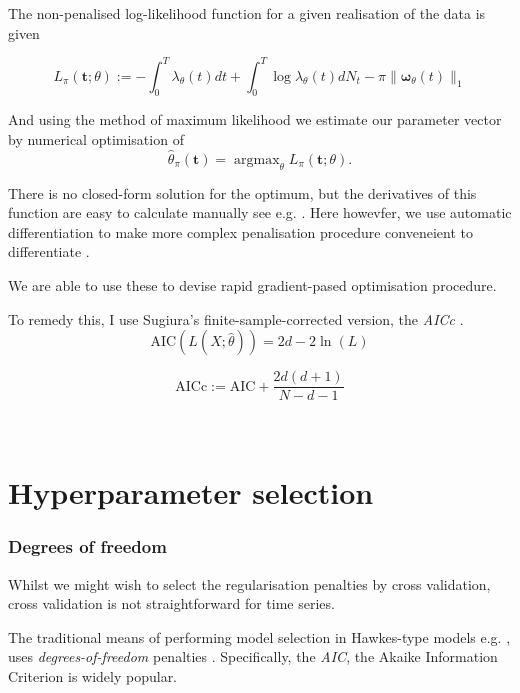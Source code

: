 \documentclass[11pt]{article}
\begin{document}
The non-penalised log-likelihood function for a given realisation of the
data is given

\[L_\pi(\mathbf t;\theta):=-\int_0^T\lambda_\theta(t)dt + \int_0^T\log \lambda_\theta(t) dN_t - \pi\|\boldsymbol \omega_\theta(t)\|_1\]

And using the method of maximum likelihood we estimate our parameter
vector by numerical optimisation of
\[\hat{\theta}_\pi(\mathbf t) = \operatorname{argmax}_\theta L_\pi(\mathbf t;\theta).\]

There is no closed-form solution for the optimum, but the derivatives of
this function are easy to calculate manually see e.g.
\cite{ozaki_maximum_1979}. Here howevfer, we use automatic
differentiation to make more complex penalisation procedure conveneient
to differentiate \cite{baydin_automatic_2014}.

We are able to use these to devise rapid gradient-pased optimisation
procedure.

    To remedy this, I use Sugiura's finite-sample-corrected version, the
\emph{AICc} \cite{sugiura_further_1978}.
\[{\mathrm {AIC}(L(X;\hat{\theta}))}=2d-2\ln(L)\]

\[{\mathrm {AICc}}:={\mathrm {AIC}}+{\frac {2d(d+1)}{N-d-1}}\]



    \begin{center}
    \end{center}
    { \hspace*{\fill} \\}
    
    \section{Hyperparameter selection}\label{hyperparameter-selection}

    \subsubsection{Degrees of freedom}\label{degrees-of-freedom}

Whilst we might wish to select the regularisation penalties by cross
validation, cross validation is not straightforward for time series.

The traditional means of performing model selection in Hawkes-type
models e.g. \cite{ogata_estimation_1983}, uses \emph{degrees-of-freedom}
penalties \cite{efron_how_1886}. Specifically, the \emph{AIC}, the
Akaike Information Criterion \cite{akaike_likelihood_1981} is widely
popular.
\end{document}
